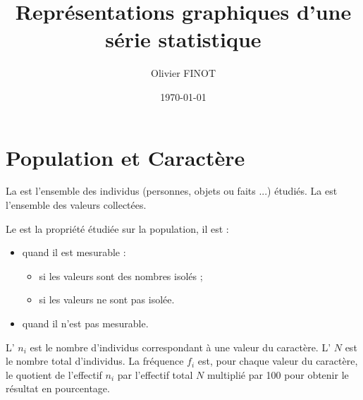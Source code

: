 \documentclass[12pt,a4paper]{article}
\author{Olivier FINOT}
\date{\today}
\title{Représentations graphiques d'une série statistique }
\begin{document}
\maketitle

\section{Population et Caractère}

\begin{pasbox}[style=defi ,degrade , pluriel, name=Population]
La  est l'ensemble des individus (personnes, objets ou faits ...) étudiés.
La  est l'ensemble des valeurs collectées.
\end{pasbox}

\begin{pasbox}[style=defi ,degrade , pluriel, name=Caractère]

Le  est la propriété étudiée sur la population, il est :
\begin{itemize}
	\item {} quand il est mesurable :
		\begin{itemize}
			\item {} si les valeurs sont des nombres isolés ;
			\item {} si les valeurs ne sont pas isolée. %
		\end{itemize}
	\item {} quand il n'est pas mesurable. %
\end{itemize}
\end{pasbox}

\begin{pasbox}[style=defi ,degrade , pluriel, name=Effectif]
	L' $n_i$ est le nombre d'individus correspondant à une valeur du caractère. L' $N$ est le nombre total d'individus.
	La fréquence $f_i$ est, pour chaque valeur du caractère, le quotient de l'effectif $n_i$ par l'effectif total $N$ multiplié par 100 pour obtenir le résultat en pourcentage.
\end{pasbox}		
\end{document}
